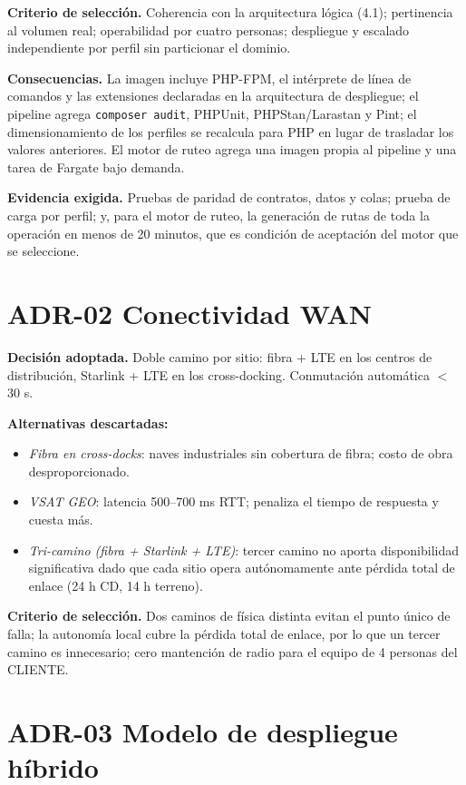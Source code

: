 \textbf{Criterio de selección.} Coherencia con la arquitectura lógica (4.1); pertinencia al volumen real; operabilidad por cuatro personas; despliegue y escalado independiente por perfil sin particionar el dominio.

\textbf{Consecuencias.} La imagen incluye PHP-FPM, el intérprete de línea de comandos y las extensiones declaradas en la arquitectura de despliegue; el pipeline agrega \texttt{composer audit}, PHPUnit, PHPStan/Larastan y Pint; el dimensionamiento de los perfiles se recalcula para PHP en lugar de trasladar los valores anteriores. El motor de ruteo agrega una imagen propia al pipeline y una tarea de Fargate bajo demanda.

\textbf{Evidencia exigida.} Pruebas de paridad de contratos, datos y colas; prueba de carga por perfil; y, para el motor de ruteo, la generación de rutas de toda la operación en menos de 20 minutos, que es condición de aceptación del motor que se seleccione.

\section{ADR-02 \textperiodcentered{} Conectividad WAN}
\label{sub:adr-02}

\textbf{Decisión adoptada.} Doble camino por sitio: fibra + LTE en los centros de distribución, Starlink + LTE en los cross-docking. Conmutación automática $<$ 30 s.

\textbf{Alternativas descartadas:}

\begin{itemize}
  \item \emph{Fibra en cross-docks}: naves industriales sin cobertura de fibra; costo de obra desproporcionado.
  \item \emph{VSAT GEO}: latencia 500--700 ms RTT; penaliza el tiempo de respuesta y cuesta más.
  \item \emph{Tri-camino (fibra + Starlink + LTE)}: tercer camino no aporta disponibilidad significativa dado que cada sitio opera autónomamente ante pérdida total de enlace (24 h CD, 14 h terreno).
\end{itemize}

\textbf{Criterio de selección.} Dos caminos de física distinta evitan el punto único de falla; la autonomía local cubre la pérdida total de enlace, por lo que un tercer camino es innecesario; cero mantención de radio para el equipo de 4 personas del CLIENTE.

\section{ADR-03 \textperiodcentered{} Modelo de despliegue híbrido}
\label{sub:adr-03}

